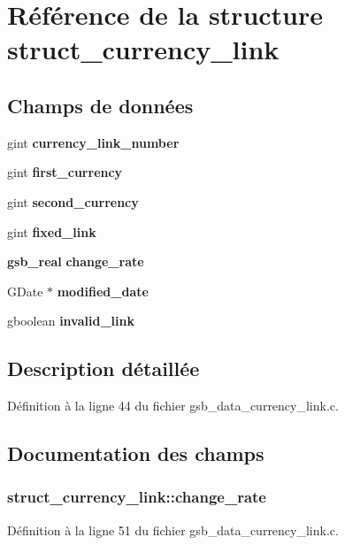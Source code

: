 \section{Référence de la structure struct\_\-currency\_\-link}
\label{structstruct__currency__link}
\subsection*{Champs de données}
\begin{DoxyCompactItemize}
\item 
gint {\bf currency\_\-link\_\-number}
\item 
gint {\bf first\_\-currency}
\item 
gint {\bf second\_\-currency}
\item 
gint {\bf fixed\_\-link}
\item 
{\bf gsb\_\-real} {\bf change\_\-rate}
\item 
GDate $\ast$ {\bf modified\_\-date}
\item 
gboolean {\bf invalid\_\-link}
\end{DoxyCompactItemize}


\subsection{Description détaillée}


Définition à la ligne 44 du fichier gsb\_\-data\_\-currency\_\-link.c.



\subsection{Documentation des champs}
\subsubsection[{change\_\-rate}]{ {\bf struct\_\-currency\_\-link::change\_\-rate}}\label{structstruct__currency__link_ac9c59174c2be461131b5586dea3f8093}


Définition à la ligne 51 du fichier gsb\_\-data\_\-currency\_\-link.c.

